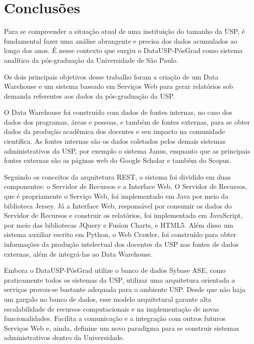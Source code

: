 \chapter{Conclusões}
\label{ch:5}

Para se compreender a situação atual de uma instituição do tamanho da USP, é fundamental fazer uma análise
abrangente e precisa dos dados acumulados ao longo dos anos. É nesse contexto que surgiu o DataUSP-PósGrad como sistema analítico da pós-graduação da Universidade de São Paulo.

\par Os dois principais objetivos desse trabalho foram a criação de um Data Warehouse e um sistema baseado em Serviços Web para gerar relatórios sob demanda referentes aos dados da pós-graduação da USP. 

\par O Data Warehouse foi construído com dados de fontes internas, no caso dos dados dos programas, áreas e pessoas, e também de fontes externas, para se obter dados da produção acadêmica dos docentes e seu impacto na comunidade científica. As fontes internas são os dados coletados pelos demais sistemas administrativos da USP, por exemplo o sistema Janus, enquanto que as principais fontes externas são as páginas web do Google Scholar e também do Scopus.

\par Seguindo os conceitos da arquitetura REST, o sistema foi dividido em duas componentes: o Servidor de Recursos e a Interface Web. O Servidor de Recursos, que é propriamente o Serviço Web, foi implementado em Java por meio da biblioteca Jersey. Já a Interface Web, responsável por consumir os dados do Servidor de Recursos e construir os relatórios, foi implementada em JavaScript, por meio das bibliotecas JQuery e Fusion Charts, e HTML5. Além disso um sistema auxiliar escrito em Python, o Web Crawler, foi construído para obter informações da produção intelectual dos docentes da USP nas fontes de dados externas, além de integrá-las ao Data Warehouse.

\par Embora o DataUSP-PósGrad utilize o banco de dados Sybase ASE, como praticamente todos os sistemas da USP, utilizar uma arquitetura orientada a serviços provou-se bastante adequada para o ambiente USP. Desde que não haja um gargalo no banco de dados, esse modelo arquitetural garante alta escalabilidade de recursos computacionais e na implementação de novas funcionalidades. Facilita a comunicação e a integração com outros futuros Serviços Web e, ainda, definine um novo paradigma para se construir sistemas administrativos dentro da Universidade.

